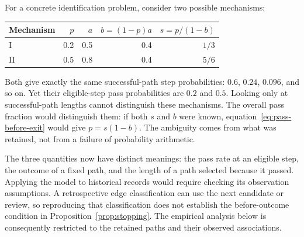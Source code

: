 For a concrete identification problem, consider two possible mechanisms:
\begin{center}
\begin{tabular}{lrrrr}
\toprule
Mechanism & $p$ & $a$ & $b=(1-p)a$ & $s=p/(1-b)$ \\
\midrule
I & 0.2 & 0.5 & 0.4 & $1/3$ \\
II & 0.5 & 0.8 & 0.4 & $5/6$ \\
\bottomrule
\end{tabular}
\end{center}
Both give exactly the same successful-path step probabilities: $0.6$, $0.24$, $0.096$, and so on. Yet their eligible-step pass probabilities are $0.2$ and $0.5$. Looking only at successful-path lengths cannot distinguish these mechanisms. The overall pass fraction would distinguish them: if both $s$ and $b$ were known, equation~\eqref{eq:pass-before-exit} would give $p=s(1-b)$. The ambiguity comes from what was retained, not from a failure of probability arithmetic.

The three quantities now have distinct meanings: the pass rate at an eligible step, the outcome of a fixed path, and the length of a path selected because it passed. Applying the model to historical records would require checking its observation assumptions. A retrospective edge classification can use the next candidate or review, so reproducing that classification does not establish the before-outcome condition in Proposition~\ref{prop:stopping}. The empirical analysis below is consequently restricted to the retained paths and their observed associations.